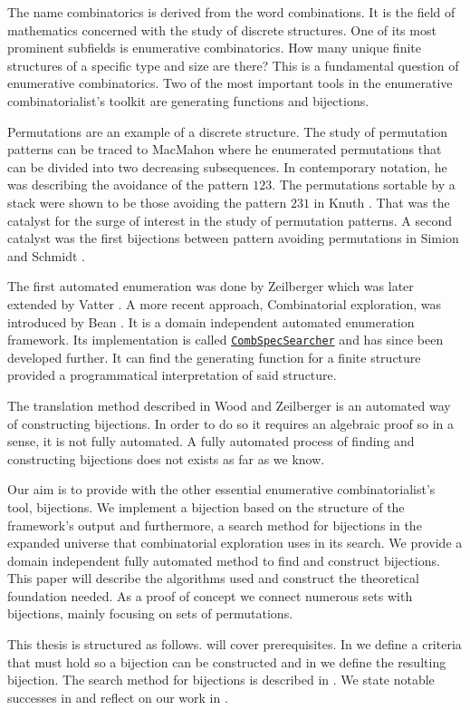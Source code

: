 \label{ch:introduction}
The name combinatorics is derived from the word combinations. It is the field of mathematics concerned with the study of discrete structures. One of its most prominent subfields is enumerative combinatorics. How many unique finite structures of a specific type and size are there? This is a fundamental question of enumerative combinatorics. Two of the most important tools in the enumerative combinatorialist's toolkit are generating functions and bijections.

Permutations are an example of a discrete structure. The study of permutation patterns can be traced to MacMahon \cite{MacMahon} where he enumerated permutations that can be divided into two decreasing subsequences. In contemporary notation, he was describing the avoidance of the pattern $123$. The permutations sortable by a stack were shown to be those avoiding the pattern $231$ in Knuth \cite{knuth:aocp1}. That was the catalyst for the surge of interest in the study of permutation patterns. A second catalyst was the first bijections between pattern avoiding permutations in Simion and Schmidt \cite{simionandschmidt}. 

The first automated enumeration was done by Zeilberger \cite{Zeilberger1998EnumerationSA} which was later extended by Vatter \cite{vatter_2008}. A more recent approach, Combinatorial exploration, was introduced by Bean \cite{BeanPhd:phd}. It is a domain independent automated enumeration framework. Its implementation is called \href{https://github.com/PermutaTriangle/comb_spec_searcher}{\texttt{CombSpecSearcher}} and has since been developed further. It can find the generating function for a finite structure provided a programmatical interpretation of said structure.

The translation method described in Wood and Zeilberger \cite{wood_zeilberger} is an automated way of constructing bijections. In order to do so it requires an algebraic proof so in a sense, it is not fully automated. A fully automated process of finding and constructing bijections does not exists as far as we know.

Our aim is to provide \css{} with the other essential enumerative combinatorialist's tool, bijections. We implement a bijection based on the structure of the framework's output and furthermore, a search method for bijections in the expanded universe that combinatorial exploration uses in its search. We provide a domain independent fully automated method to find and construct bijections. This paper will describe the algorithms used and construct the theoretical foundation needed. As a proof of concept we connect numerous sets with bijections, mainly focusing on sets of permutations.

This thesis is structured as follows.  will cover prerequisites. In  we define a criteria that must hold so a bijection can be constructed and in  we define the resulting bijection. The search method for bijections is described in . We state notable successes in  and reflect on our work in .
